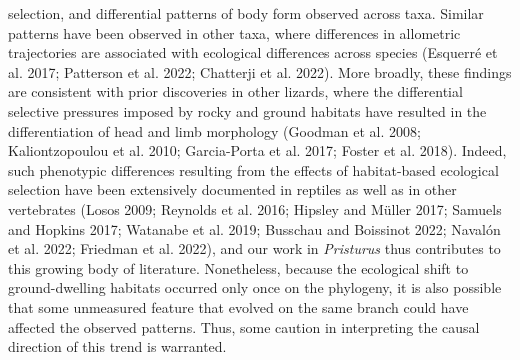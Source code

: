 \documentclass[
  11pt,
]{article}
\begin{document}
selection, and differential patterns of body form observed across taxa.
Similar patterns have been observed in other taxa, where differences in
allometric trajectories are associated with ecological differences
across species (Esquerré et al. 2017; Patterson et al. 2022; Chatterji
et al. 2022). More broadly, these findings are consistent with prior
discoveries in other lizards, where the differential selective pressures
imposed by rocky and ground habitats have resulted in the
differentiation of head and limb morphology (Goodman et al. 2008;
Kaliontzopoulou et al. 2010; Garcia-Porta et al. 2017; Foster et al.
2018). Indeed, such phenotypic differences resulting from the effects of
habitat-based ecological selection have been extensively documented in
reptiles as well as in other vertebrates (Losos 2009; Reynolds et al.
2016; Hipsley and Müller 2017; Samuels and Hopkins 2017; Watanabe et al.
2019; Busschau and Boissinot 2022; Navalón et al. 2022; Friedman et al.
2022), and our work in \emph{Pristurus} thus contributes to this growing
body of literature. Nonetheless, because the ecological shift to
ground-dwelling habitats occurred only once on the phylogeny, it is also
possible that some unmeasured feature that evolved on the same branch
could have affected the observed patterns. Thus, some caution in
interpreting the causal direction of this trend is warranted.
\hfill\break
\end{document}
